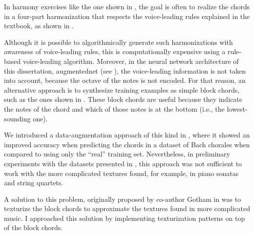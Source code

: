 
In harmony exercises like the one shown in
, the goal is often to
\gls{realize} the chords in a four-part harmonization that
respects the voice-leading rules explained in the textbook,
as shown in . 


Although it is possible to algorithmically generate such
harmonizations with awareness of voice-leading rules, this
is computationally expensive using a rule-based
voice-leading
algorithm.
Moreover, in the neural network architecture of this
dissertation, \gls{augmentednet} (see
), the voice-leading information is not
taken into account, because the octave of the notes is not
encoded. For that reason, an alternative approach is to
synthesize training examples as simple block chords, such as
the ones shown in . These block
chords are useful because they indicate the notes of the
chord and which of those notes is at the bottom (i.e., the
lowest-sounding one). 

We introduced a data-augmentation approach of this kind in
\textcite{napoleslopez2020harmonic}, where it showed an
improved accuracy when predicting the chords in a dataset of
Bach chorales when compared to using only the ``real''
training set. Nevertheless, in preliminary experiments with
the datasets presented in
, this approach was not
sufficient to work with the more complicated textures found,
for example, in piano sonatas and string quartets.


A solution to this problem, originally proposed by co-author
Gotham in \textcite{napoleslopez2021augmentednet} was to
texturize the block chords to approximate the textures found
in more complicated music. I approached this solution by
implementing texturization patterns on top of the block
chords.
